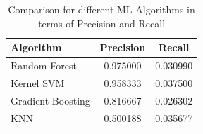 \begin{table}[pt]
\caption{Comparison for different ML Algorithms in terms of Precision and Recall}
\label{TableAlgos} 
\begin{center}
\begin{tabular}{lcc}
\hline \bf Algorithm &  Precision &    Recall \\\hline
Random Forest  &   0.975000 &  0.030990 \\
Kernel SVM &   0.958333 &  0.037500 \\
Gradient Boosting  &   0.816667 &  0.026302 \\
KNN &   0.500188 &  0.035677 \\
\hline
\end{tabular}
\end{center}
\end{table}


